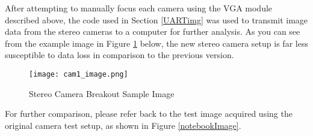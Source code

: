 \par
After attempting to manually focus each camera using the VGA module described above, the code used in Section \ref{UARTimg} was used to transmit image data from the stereo cameras to a computer for further analysis. As you can see from the example image in Figure \ref{newBoardImage} below, the new stereo camera setup is far less susceptible to data loss in comparison to the previous version. 
\begin{figure}[H] 
	\centering
	\texttt{[image: cam1\_image.png]}
	\caption{Stereo Camera Breakout Sample Image}
	\label{newBoardImage}
\end{figure}
\par
For further comparison, please refer back to the test image acquired using the original camera test setup, as shown in Figure \ref{notebookImage}.